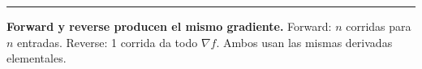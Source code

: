\documentclass[11pt]{article}
\begin{document}
\vspace{6pt}
\hrule
\vspace{4pt}

\begin{center}
\small
\textcolor{textgray}{
\textbf{Forward y reverse producen el mismo gradiente.} \quad
Forward: $n$ corridas para $n$ entradas. \quad
Reverse: 1 corrida da todo $\nabla f$. \quad
Ambos usan las mismas derivadas elementales.
}
\end{center}
\end{document}
